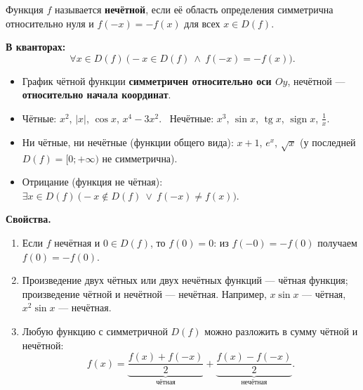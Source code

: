 \documentclass[a4paper,11pt]{article}
\DeclareMathOperator{\tg}{tg}
\newcommand{\kv}{\par\noindent\textbf{\textcolor{oprc!85!black}{В кванторах:}}}
\begin{document}
\begin{opr}
Функция $f$ называется \textbf{нечётной}, если её область определения симметрична относительно нуля и $f(-x) = -f(x)$ для всех $x \in D(f)$.
\kv
\[
  \forall x \in D(f)\ \bigl( -x \in D(f) \ \wedge\ f(-x) = -f(x) \bigr).
\]
\end{opr}

\begin{itemize}[leftmargin=*]
  \item График чётной функции \textbf{симметричен относительно оси $Oy$}, нечётной --- \textbf{относительно начала координат}.
  \item Чётные: $x^2$, $|x|$, $\cos x$, $x^4 - 3x^2$. \ Нечётные: $x^3$, $\sin x$, $\tg x$, $\operatorname{sign} x$, $\frac1x$.
  \item Ни чётные, ни нечётные (функции общего вида): $x + 1$, $e^x$, $\sqrt{x}$ (у последней $D(f) = [0; +\infty)$ не симметрична).
  \item Отрицание (функция не чётная): $\exists x \in D(f)\ \bigl(-x \notin D(f) \ \vee\ f(-x) \ne f(x)\bigr)$.
\end{itemize}

\textbf{Свойства.}
\begin{enumerate}[leftmargin=*]
  \item Если $f$ нечётная и $0 \in D(f)$, то $f(0) = 0$: из $f(-0) = -f(0)$ получаем $f(0) = -f(0)$.
  \item Произведение двух чётных или двух нечётных функций --- чётная функция; произведение чётной и нечётной --- нечётная.
        Например, $x \sin x$ --- чётная, $x^2 \sin x$ --- нечётная.
  \item Любую функцию с симметричной $D(f)$ можно разложить в сумму чётной и нечётной:
        \[
          f(x) = \underbrace{\frac{f(x) + f(-x)}{2}}_{\text{чётная}} + \underbrace{\frac{f(x) - f(-x)}{2}}_{\text{нечётная}}.
        \]
\end{enumerate}

\begin{center}
\qquad\qquad
{}
\end{center}
\end{document}
